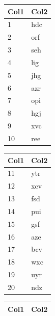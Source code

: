 \documentclass{article}
\begin{document}
\begin{table}[htb]
	\begin{minipage}[t]{0.19\linewidth}
		\centering
		\begin{tabular}{l l}
			\hline
			\rowcolor{DarkColor} 
			\textbf{Col1} 			& \textbf{Col2} \\ 
			\hline
			1 & hdc \\
			2 & orf \\
			3 & seh \\
			4 & lig \\
			5 & jhg \\
			6 & azr \\
			7 & opi \\
			8 & hgj \\
			9 & xvc \\
			10 & ree \\
			\hline
		\end{tabular}
	\end{minipage}
	\begin{minipage}[t]{0.19\linewidth}
		\centering
		\begin{tabular}{l l}
			\hline
			\rowcolor{DarkColor} 
			\textbf{Col1} 			& \textbf{Col2} \\ 
			\hline
			11 & ytr \\
			12 & xcv \\
			13 & fsd \\
			14 & pui \\
			15 & gsf \\
			16 & aze \\
			17 & bcv \\
			18 & wxc \\
			19 & uyr \\
			20 & ndz \\
			\hline
		\end{tabular}
	\end{minipage}
	\begin{minipage}[t]{0.19\linewidth}
		\centering
		\begin{tabular}{l l}
			\hline
			\rowcolor{DarkColor} 
			\textbf{Col1} 			& \textbf{Col2} \\ 
			\hline

\end{tabular}
\end{minipage}
\end{table}
\end{document}

